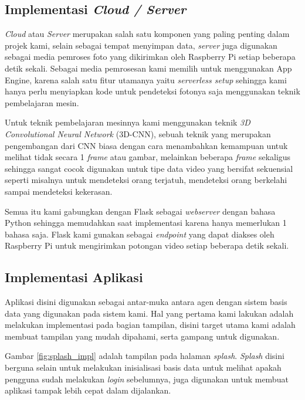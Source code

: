 \subsection{Implementasi \textit{Cloud / Server}}

\textit{Cloud} atau \textit{Server} merupakan salah satu komponen yang paling penting dalam projek kami, selain sebagai tempat menyimpan data, \textit{server} juga digunakan sebagai media pemroses foto yang dikirimkan oleh Raspberry Pi setiap beberapa detik sekali. Sebagai media pemrosesan kami memilih untuk menggunakan App Engine, karena salah satu fitur utamanya yaitu \textit{serverless setup} sehingga kami hanya perlu menyiapkan kode untuk pendeteksi fotonya saja menggunakan teknik pembelajaran mesin.

Untuk teknik pembelajaran mesinnya kami menggunakan teknik \textit{3D Convolutional Neural Network} (3D-CNN), sebuah teknik yang merupakan pengembangan dari CNN biasa dengan cara menambahkan kemampuan untuk melihat tidak secara 1 \textit{frame} atau gambar, melainkan beberapa \textit{frame} sekaligus sehingga sangat cocok digunakan untuk tipe data video yang bersifat sekuensial seperti misalnya untuk mendeteksi orang terjatuh, mendeteksi orang berkelahi sampai mendeteksi kekerasan.

Semua itu kami gabungkan dengan Flask sebagai \textit{webserver} dengan bahasa Python sehingga memudahkan saat implementasi karena hanya memerlukan 1 bahasa saja. Flask kami gunakan sebagai \textit{endpoint} yang dapat diakses oleh Raspberry Pi untuk mengirimkan potongan video setiap beberapa detik sekali.

\subsection{Implementasi Aplikasi}

Aplikasi disini digunakan sebagai antar-muka antara agen dengan sistem basis data yang digunakan pada sistem kami. Hal yang pertama kami lakukan adalah melakukan implementasi pada bagian tampilan, disini target utama kami adalah membuat tampilan yang mudah dipahami, serta gampang untuk digunakan.

Gambar \ref{fig:splash_impl} adalah tampilan pada halaman \textit{splash}. \textit{Splash} disini berguna selain untuk melakukan inisialisasi basis data untuk melihat apakah pengguna sudah melakukan \textit{login} sebelumnya, juga digunakan untuk membuat aplikasi tampak lebih cepat dalam dijalankan.

